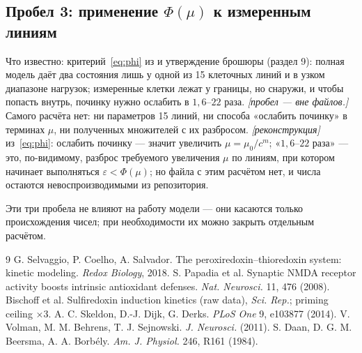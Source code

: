 \documentclass[11pt,a4paper]{article}
\theoremstyle{remark}
\newcommand{\code}[1]{\texttt{\detokenize{#1}}}
\begin{document}
\subsection{Пробел 3: применение $\Phi(\mu)$ к измеренным линиям}
\label{sec:gap3}
Что известно: критерий~\eqref{eq:phi} из \code{core_model.py} и утверждение брошюры
(раздел 9): полная модель даёт два состояния лишь у одной из 15 клеточных линий и в
узком диапазоне нагрузок; измеренные клетки лежат у границы, но снаружи, и чтобы
попасть внутрь, починку нужно ослабить в $1{,}6$--$22$ раза.
\emph{[пробел --- вне файлов.]} Самого расчёта нет: ни параметров 15 линий, ни способа
«ослабить починку» в терминах $\mu$, ни полученных множителей с их разбросом.
\emph{[реконструкция]} из~\eqref{eq:phi}: ослабить починку --- значит увеличить
$\mu=\mu_0/c^{m}$; «$1{,}6$--$22$ раза» --- это, по-видимому, разброс требуемого
увеличения $\mu$ по линиям, при котором начинает выполняться
$\varepsilon<\Phi(\mu)$; но файла с этим расчётом нет, и числа остаются
невоспроизводимыми из репозитория.

Эти три пробела не влияют на работу модели --- они касаются только происхождения
чисел; при необходимости их можно закрыть отдельным расчётом.

\smallskip
\begin{thebibliography}{9}\small
\itemsep0pt
 G. Selvaggio, P. Coelho, A. Salvador. The peroxiredoxin--thioredoxin
system: kinetic modeling. \emph{Redox Biology}, 2018.
 S. Papadia et al. Synaptic NMDA receptor activity boosts intrinsic
antioxidant defenses. \emph{Nat. Neurosci.} 11, 476 (2008).
 Bischoff et al. Sulfiredoxin induction kinetics (raw data), \emph{Sci. Rep.};
priming ceiling $\times3$.
 A. C. Skeldon, D.-J. Dijk, G. Derks. \emph{PLoS One} 9, e103877 (2014).
 V. Volman, M. M. Behrens, T. J. Sejnowski. \emph{J. Neurosci.} (2011).
 S. Daan, D. G. M. Beersma, A. A. Borb\'ely. \emph{Am. J. Physiol.} 246, R161 (1984).
\end{thebibliography}
\end{document}
